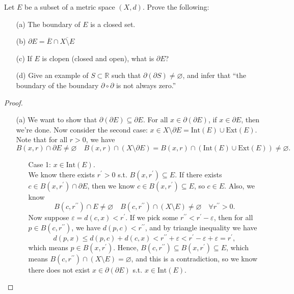 \begin{problem}[20 pts]
    Let $E$ be a subset of a metric space $(X,d)$. Prove the following:
\begin{enumerate}
  \item[(a)] The boundary of $E$ is a closed set.  
  \item[(b)]  $\partial E= \overline{E} \cap    \overline{X \setminus E}$ 
    \item[(c)]  If $E$ is clopen (closed and open), what is $\partial E$?
  \item[(d)] Give an example of $S \subset \mathbb{R}$ such that $\partial(\partial S) \neq \varnothing$, and infer that ``the boundary of the boundary $\partial \circ \partial$ is not always zero.''
\end{enumerate}
\end{problem}
\begin{proof}
  \vphantom{text}
  \begin{itemize}
    \item [(a)] We want to show that \(\partial (\partial E) \subseteq \partial E\). For all \(x \in \partial (\partial E)\), if \(x \in \partial E\), then we're done. Now consider the second case: \(x \in X \setminus \partial E = \mathrm{Int}(E) \cup \mathrm{Ext}(E)\). Note that for all \(r > 0\), we have 
    \[
      B(x, r) \cap \partial E \neq \varnothing \quad B(x,r) \cap (X \setminus \partial E) = B(x,r) \cap (\mathrm{Int}(E) \cup \mathrm{Ext}(E)) \neq \varnothing.
    \]
    \begin{itemize}
      \item [Case 1:] \(x \in \mathrm{Int}(E) \). \\
      We know there exists \(r^{\prime} > 0\) s.t. \(B(x, r^{\prime}) \subseteq E\). If there exists \(c \in B(x, r^{\prime} ) \cap \partial E\), then we know \(c \in B(x, r^{\prime} ) \subseteq E\), so \(c \in E\). Also, we know 
      \[
        B(c, r^{\prime\prime} ) \cap E \neq \varnothing \quad B(c, r^{\prime\prime} ) \cap (X \setminus E) \neq \varnothing \quad \forall r^{\prime\prime} >0.
      \]
      Now suppose \(\varepsilon = d(c, x) < r^{\prime} \). If we pick some \(r^{\prime\prime} < r^{\prime}  - \varepsilon \), then for all \(p \in B(c, r^{\prime\prime} )\), we have \(d(p, c) < r^{\prime\prime} \), and by triangle inequality we have 
      \[
        d(p,x) \le d(p,c) + d(c,x) < r^{\prime\prime} + \varepsilon < r^{\prime} - \varepsilon + \varepsilon = r^{\prime} ,
      \] which means \(p \in B(x, r^{\prime} )\). Hence, \(B(c, r^{\prime\prime} ) \subseteq B(x, r^{\prime} ) \subseteq E\), which means \(B(c, r^{\prime\prime} ) \cap (X \setminus E) = \varnothing \), and this is a contradiction, so we know there does not exist \(x \in \partial (\partial E) \) s.t. \(x \in \mathrm{Int}(E) \).   

\end{itemize}
\end{itemize}
\end{proof}
